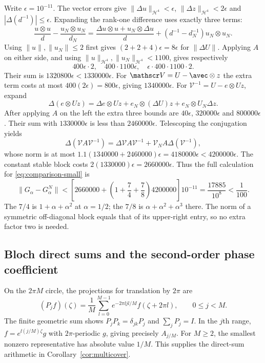 Write $\epsilon=10^{-11}$. The vector errors give
$\|\Delta u\|_{\mathcal H^4}<\epsilon$,
$\|\Delta z\|_{\mathcal H^4}<2\epsilon$ and
$|\Delta(d^{-1})|\le\epsilon$.
Expanding the rank-one difference uses exactly three terms:
\[
 \frac{u\otimes u}{d}-\frac{u_N\otimes u_N}{d_N}
 =\frac{\Delta u\otimes u+u_N\otimes\Delta u}{d}
 +(d^{-1}-d_N^{-1})u_N\otimes u_N.
\]
Using $\|u\|,\|u_N\|\le2$ first gives
$(2+2+4)\epsilon=8\epsilon$ for $\|\Delta U\|$.
Applying $A$ on either side, and using $\|u\|_{\mathcal H^4},
\|u_N\|_{\mathcal H^4}<1100$, gives respectively
\[
 400\epsilon\cdot2,\quad400\cdot1100\epsilon,\quad
 \epsilon\cdot400\cdot1100\cdot2.
\]
Their sum is $1320800\epsilon<1330000\epsilon$.
For $\mathscr V=U-\avec\otimes z$ the extra term costs at most
$400(2\epsilon)=800\epsilon$, giving $1340000\epsilon$.
For $\mathscr V^{-1}=U-e\otimes Uz$, expand
\[
 \Delta(e\otimes Uz)=\Delta e\otimes Uz
             +e_N\otimes(\Delta U)z+e_N\otimes U_N\Delta z.
\]
After applying $A$ on the left the extra three bounds are
$40\epsilon$, $320000\epsilon$ and $800000\epsilon$.
Their sum with $1330000\epsilon$ is less than $2460000\epsilon$.
Telescoping the conjugation yields
\[
 \Delta(\mathscr VA\mathscr V^{-1})
 =\Delta\mathscr V A\mathscr V^{-1}
       +\mathscr V_N A\Delta(\mathscr V^{-1}),
\]
whose norm is at most $1.1(1340000+2460000)\epsilon
=4180000\epsilon<4200000\epsilon$.
The constant stable block costs $2(1330000)\epsilon=2660000\epsilon$.
Thus the full calculation for \eqref{eq:comparison-small} is
\begin{equation}\label{eq:comparison-numeric-expanded}
 \|G_\alpha-G_\alpha^N\|
 <\left[2660000+\left(1+\frac74+\frac78\right)4200000\right]10^{-11}
 =\frac{17885}{10^8}<\frac1{100}.
\end{equation}
The $7/4$ is $1+\alpha+\alpha^2$ at $\alpha=1/2$;
the $7/8$ is $\alpha+\alpha^2+\alpha^3$ there. The norm of a symmetric
off-diagonal block equals that of its upper-right entry, so no extra factor
two is needed.

\subsection{Bloch direct sums and the second-order phase coefficient}
On the $2\pi M$ circle, the projections for translation by $2\pi$ are
\[
 (P_jf)(\zeta)=\frac1M\sum_{l=0}^{M-1}
   e^{-2\pi\ii jl/M}f(\zeta+2\pi l),\qquad 0\le j<M.
\]
The finite geometric sum shows $P_jP_k=\delta_{jk}P_j$ and
$\sum_jP_j=I$. In the $j$th range, $f=e^{\ii(j/M)\zeta}g$ with
$2\pi$-periodic $g$, giving precisely $A_{j/M}$.
For $M\ge2$, the smallest nonzero representative has absolute value $1/M$.
This supplies the direct-sum arithmetic in Corollary~\ref{cor:multicover}.

